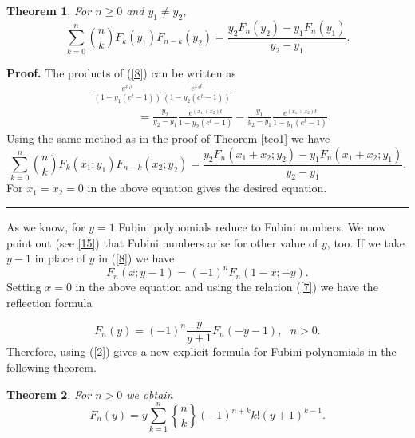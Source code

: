 \documentclass{article}%
\newtheorem{theorem}{Theorem}
\newenvironment{proof}[1][Proof]{\noindent\textbf{#1.} }{\ \rule{0.5em}{0.5em}}
\begin{document}
\begin{theorem}
For $n\geq0$ and $y_{1}\neq y_{2}$,%
\begin{equation}
\sum_{k=0}^{n}\binom{n}{k}F_{k}\left(  y_{1}\right)  F_{n-k}\left(
y_{2}\right)  =\frac{y_{2}F_{n}\left(  y_{2}\right)  -y_{1}F_{n}\left(
y_{1}\right)  }{y_{2}-y_{1}}. \label{23}%
\end{equation}
\bigskip
\end{theorem}

\begin{proof}
The products of (\ref{8}) can be written as%
\begin{align}
&  \frac{e^{x_{1}t}}{\left(  1-y_{1}\left(  e^{t}-1\right)  \right)  }%
\frac{e^{x_{2}t}}{\left(  1-y_{2}\left(  e^{t}-1\right)  \right)  }%
\label{69}\\
&  \qquad\qquad=\frac{y_{2}}{y_{2}-y_{1}}\frac{e^{\left(  x_{1}+x_{2}\right)
t}}{1-y_{2}\left(  e^{t}-1\right)  }-\frac{y_{1}}{y_{2}-y_{1}}\frac{e^{\left(
x_{1}+x_{2}\right)  t}}{1-y_{1}\left(  e^{t}-1\right)  }.\nonumber
\end{align}
Using the same method as in the proof of Theorem \ref{teo1} we have{}%
\[
\sum_{k=0}^{n}\binom{n}{k}F_{k}\left(  x_{1};y_{1}\right)  F_{n-k}\left(
x_{2};y_{2}\right)  =\frac{y_{2}F_{n}\left(  x_{1}+x_{2};y_{2}\right)
-y_{1}F_{n}\left(  x_{1}+x_{2};y_{1}\right)  }{y_{2}-y_{1}}.
\]
For $x_{1}=x_{2}=0$ in the above equation gives the desired equation.
\end{proof}

As we know, for $y=1$ Fubini polynomials reduce to Fubini numbers. We now
point out (see \eqref{15}) that Fubini numbers arise for other value of $y$,
too. If we take $y-1$ in place of $y$ in (\ref{8}) we have
\begin{equation}
F_{n}\left(  x;y-1\right)  =\left(  -1\right)  ^{n}F_{n}\left(  1-x;-y\right)
. \label{18}%
\end{equation}
Setting $x=0$ in the above equation and using the relation (\ref{7}) we have
the reflection formula%

\begin{equation}
F_{n}\left(  y\right)  =\left(  -1\right)  ^{n}\frac{y}{y+1}F_{n}\left(
-y-1\right)  ,\text{ \ }n>0. \label{19}%
\end{equation}
Therefore, using (\ref{2}) gives a new explicit formula for Fubini polynomials
in the following theorem.

\begin{theorem}
\label{teo4}For $n>0$ we obtain
\begin{equation}
F_{n}\left(  y\right)  =y\sum_{k=1}^{n}%
\genfrac{\{}{\}}{0pt}{}{n}{k}%
\left(  -1\right)  ^{n+k}k!\left(  y+1\right)  ^{k-1}. \label{21}%
\end{equation}

\end{theorem}
\end{document}
